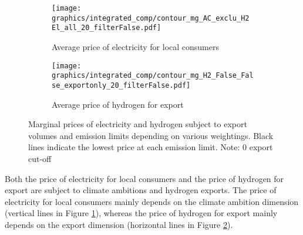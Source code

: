 
\begin{figure*}[t] %
    \centering
    \begin{subfigure}[b]{0.49\linewidth}
        \centering
        \texttt{[image: graphics/integrated\_comp/contour\_mg\_AC\_exclu\_H2 El\_all\_20\_filterFalse.pdf]}
        \caption{Average price of electricity for local consumers}
        \label{fig:local_el_price}
    \end{subfigure}
    \hfill
    \begin{subfigure}[b]{0.49\linewidth}
        \centering
        \texttt{[image: graphics/integrated\_comp/contour\_mg\_H2\_False\_False\_exportonly\_20\_filterFalse.pdf]}
        \caption{Average price of hydrogen for export}
        \label{fig:export_hy_price}
    \end{subfigure}
    \hfill
    \caption{Marginal prices of electricity and hydrogen subject to export volumes and emission limits depending on various weightings. Black lines indicate the lowest price at each emission limit. Note: 0 export cut-off}
    \label{fig:marginal_prices}
\end{figure*}

Both the price of electricity for local consumers and the price of hydrogen for export are subject to climate ambitions and hydrogen exports. The price of electricity for local consumers mainly depends on the climate ambition dimension (vertical lines in Figure \ref{fig:local_el_price}), whereas the price of hydrogen for export mainly depends on the export dimension (horizontal lines in Figure \ref{fig:export_hy_price}).



